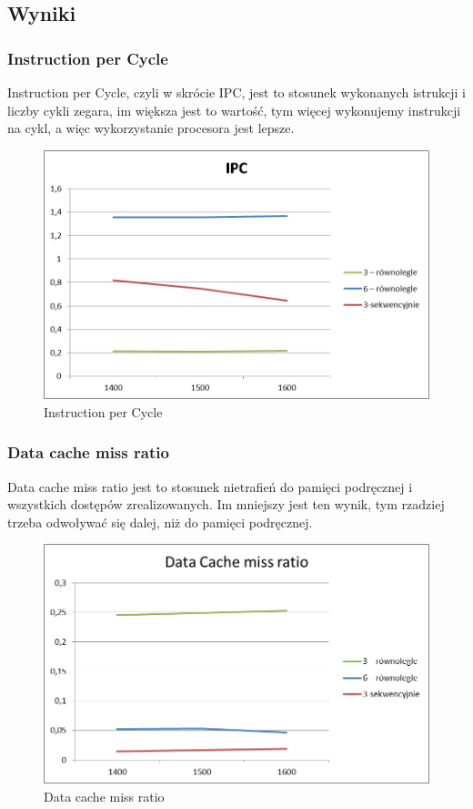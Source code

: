 \documentclass{article}
\begin{document}
\subsection{Wyniki}
\subsubsection{Instruction per Cycle}
Instruction per Cycle, czyli w skrócie IPC, jest to stosunek wykonanych istrukcji i liczby cykli zegara, im większa jest to wartość, tym więcej wykonujemy instrukcji na cykl, a więc wykorzystanie procesora jest lepsze.

\begin{figure}[H]
	\centering
	\includegraphics[width=\linewidth]{./images/wykresy/IPC.png}
	\caption{Instruction per Cycle}
	\label{fig:wykres1}
\end{figure}

\subsubsection{Data cache miss ratio}
Data cache miss ratio jest to stosunek nietrafień do pamięci podręcznej i wszystkich dostępów zrealizowanych. Im mniejszy jest ten wynik, tym rzadziej trzeba odwoływać się dalej, niż do pamięci podręcznej. 

\begin{figure}[H]
	\centering
	\includegraphics[width=\linewidth]{./images/wykresy/miss_ratio.png}
	\caption{Data cache miss ratio}
	\label{fig:wykres2}
\end{figure}
\end{document}
